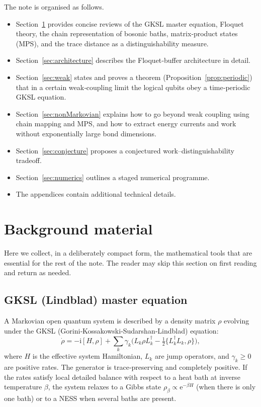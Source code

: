 \documentclass[11pt,a4paper]{article}
\theoremstyle{definition}
\theoremstyle{remark}
\newcommand{\ee}{\mathrm{e}}
\newcommand{\ii}{\mathrm{i}}
\begin{document}
The note is organised as follows.
\begin{itemize}
    \item Section~\ref{sec:background} provides concise reviews of the GKSL master equation, Floquet theory, the chain representation of bosonic baths, matrix‑product states (MPS), and the trace distance as a distinguishability measure.
    \item Section~\ref{sec:architecture} describes the Floquet‑buffer architecture in detail.
    \item Section~\ref{sec:weak} states and proves a theorem (Proposition~\ref{prop:periodic}) that in a certain weak‑coupling limit the logical qubits obey a time‑periodic GKSL equation.
    \item Section~\ref{sec:nonMarkovian} explains how to go beyond weak coupling using chain mapping and MPS, and how to extract energy currents and work without exponentially large bond dimensions.
    \item Section~\ref{sec:conjecture} proposes a conjectured work–distinguishability tradeoff.
    \item Section~\ref{sec:numerics} outlines a staged numerical programme.
    \item The appendices contain additional technical details.
\end{itemize}

\section{Background material}\label{sec:background}
Here we collect, in a deliberately compact form, the mathematical tools that are essential for the rest of the note. The reader may skip this section on first reading and return as needed.

\subsection{GKSL (Lindblad) master equation}\label{sec:GKSL}
A Markovian open quantum system is described by a density matrix $\rho$ evolving under the GKSL (Gorini‑Kossakowski‑Sudarshan‑Lindblad) equation:
\begin{equation}\label{eq:GKSL_general}
\dot\rho = -\ii[H,\rho] + \sum_k \gamma_k \Big( L_k \rho L_k^\dagger - \tfrac12 \{ L_k^\dagger L_k, \rho \} \Big),
\end{equation}
where $H$ is the effective system Hamiltonian, $L_k$ are jump operators, and $\gamma_k\ge0$ are positive rates. The generator is trace‑preserving and completely positive. If the rates satisfy local detailed balance with respect to a heat bath at inverse temperature $\beta$, the system relaxes to a Gibbs state $\rho_\beta\propto\ee^{-\beta H}$ (when there is only one bath) or to a NESS when several baths are present.
\end{document}
